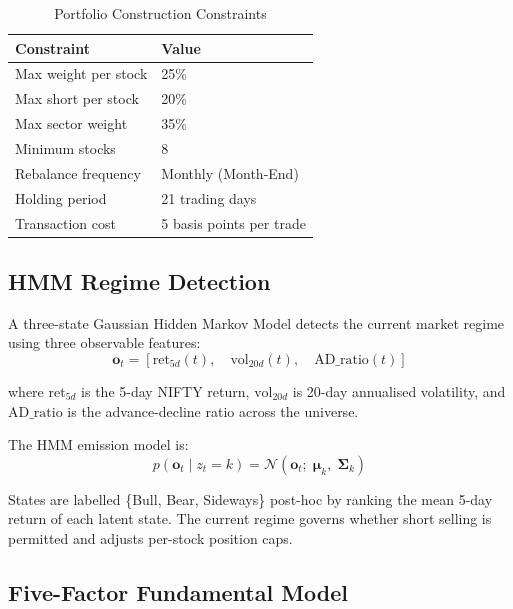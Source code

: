 \documentclass[12pt, a4paper]{article}
\begin{document}
\begin{table}[H]
\centering
\caption{Portfolio Construction Constraints}
\renewcommand{\arraystretch}{1.3}
\begin{tabular}{@{}ll@{}}
\toprule
\textbf{Constraint} & \textbf{Value} \\ \midrule
Max weight per stock     & 25\% \\
Max short per stock      & 20\% \\
Max sector weight        & 35\% \\
Minimum stocks           & 8 \\
Rebalance frequency      & Monthly (Month-End) \\
Holding period           & 21 trading days \\
Transaction cost         & 5 basis points per trade \\
\bottomrule
\end{tabular}
\end{table}

\subsection{HMM Regime Detection}

A three-state Gaussian Hidden Markov Model detects the current market regime using three observable features:
\begin{equation}
    \mathbf{o}_t = \left[\text{ret}_{5d}(t),\quad \text{vol}_{20d}(t),\quad \text{AD\_ratio}(t)\right]
\end{equation}

where $\text{ret}_{5d}$ is the 5-day NIFTY return, $\text{vol}_{20d}$ is 20-day annualised volatility, and $\text{AD\_ratio}$ is the advance-decline ratio across the universe.

The HMM emission model is:
\begin{equation}
    p(\mathbf{o}_t \mid z_t = k) = \mathcal{N}(\mathbf{o}_t;\; \boldsymbol{\mu}_k,\; \boldsymbol{\Sigma}_k)
\end{equation}

States are labelled \{Bull, Bear, Sideways\} post-hoc by ranking the mean 5-day return of each latent state. The current regime governs whether short selling is permitted and adjusts per-stock position caps.

\subsection{Five-Factor Fundamental Model}
\end{document}
